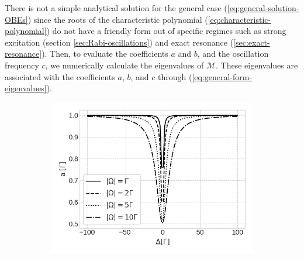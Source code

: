 {There is not a simple analytical solution for the general case (\ref{eq:general-solution-OBEs}) since the roots of the characteristic polynomial (\ref{eq:characteristic-polynomial}) do not have a friendly form out of specific regimes such as strong excitation (section \ref{sec:Rabi-oscillations}) and exact resonance (\ref{sec:exact-resonance}). Then, to evaluate the coefficients $ a $ and $ b $, and the oscillation frequency $ c $, we numerically calculate the eigenvalues of $ \mathcal{M} $. These eigenvalues are associated with the coefficients $ a $, $ b $, and $ c $ through (\ref{eq:general-form-eigenvalues}).

\begin{figure}[H]
	\caption{Damping coefficients $ a $ and $ b $}
	\begin{subfigure}[t]{0.48\textwidth}
		\centering
		\includegraphics[width=1.0\textwidth]{USPSC-img/damping_coefficient_a.png}
		\vspace{-5pt}
	\label{fig:damping-coefficient-a}
	\end{subfigure}
	\hfill
	\begin{subfigure}[t]{0.48\textwidth}
		\centering

\end{subfigure}
\end{figure}}
